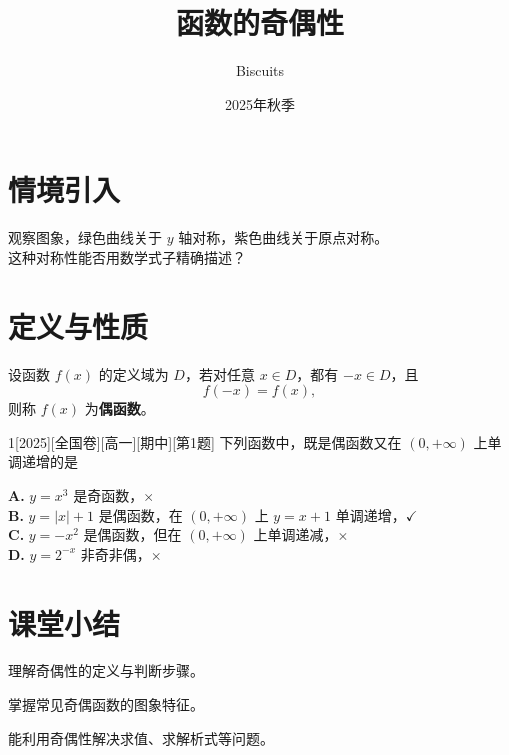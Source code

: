 \documentclass{biscuitsarticle}
\title{函数的奇偶性}
\author{Biscuits}
\date{2025年秋季}
\begin{document}
	
	\section{情境引入}
	
	\begin{sikao}
		观察图象，绿色曲线关于 $y$ 轴对称，紫色曲线关于原点对称。\\
		这种对称性能否用数学式子精确描述？
	\end{sikao}
	
	\section{定义与性质}
	\begin{definition}[偶函数]
		设函数 $f(x)$ 的定义域为 $D$，若对任意 $x\in D$，都有 $-x\in D$，且
		\[ f(-x)=f(x), \]
		则称 $f(x)$ 为\textbf{偶函数}。
	\end{definition}
	
	\begin{exercise}{1}[2025][全国卷][高一][期中][第1题]
		下列函数中，既是偶函数又在 $(0,+\infty)$ 上单调递增的是
		\begin{choices}
		\end{choices}
	\end{exercise}
	
	\begin{solutions}
		\textbf{A.} $y=x^3$ 是奇函数，$\times$\\
		\textbf{B.} $y=|x|+1$ 是偶函数，在 $(0,+\infty)$ 上 $y=x+1$ 单调递增，$\checkmark$\\
		\textbf{C.} $y=-x^2$ 是偶函数，但在 $(0,+\infty)$ 上单调递减，$\times$\\
		\textbf{D.} $y=2^{-x}$ 非奇非偶，$\times$
	\end{solutions}
	
	\section{课堂小结}
	\begin{quan}
		\item 理解奇偶性的定义与判断步骤。
		\item 掌握常见奇偶函数的图象特征。
		\item 能利用奇偶性解决求值、求解析式等问题。
	\end{quan}
	
\end{document}
